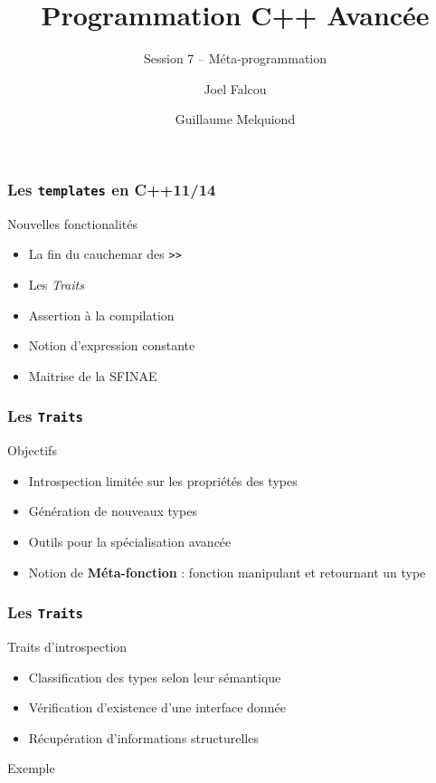 \documentclass[svgnames]{beamer}
\title{Programmation C++ Avancée}
\subtitle{Session 7 -- Méta-programmation}
\author{Joel Falcou \and Guillaume Melquiond}
\institute{Laboratoire de Recherche en Informatique}
\date{}
\begin{document}



\begin{frame}[plain]
\titlepage
\end{frame}
\setcounter{framenumber}{0}

\frame
{
  \frametitle{Les \texttt{templates} en C++11/14}

  \begin{block}{Nouvelles fonctionalit\'es}
  \begin{itemize}
  \item La fin du cauchemar des \texttt{>>}
  \item Les \textit{Traits}
  \item Assertion \`a la compilation
  \item Notion d'expression constante
  \item Maitrise de la SFINAE
  \end{itemize}
  \end{block}
}

\frame
{
  \frametitle{Les \texttt{Traits}}

  \begin{block}{Objectifs}
  \begin{itemize}
  \item Introspection limit\'ee sur les propri\'et\'es des types
  \item G\'en\'eration de nouveaux types
  \item Outils pour la sp\'ecialisation avanc\'ee
  \item Notion de \textbf{M\'eta-fonction} : fonction manipulant et retournant un type
  \end{itemize}
  \end{block}
}

\frame
{
  \frametitle{Les \texttt{Traits}}

  \begin{block}{Traits d'introspection}
  \begin{itemize}
  \item Classification des types selon leur s\'emantique
  \item V\'erification d'existence d'une interface donn\'ee
  \item R\'ecup\'eration d'informations structurelles
  \end{itemize}
  \end{block}

  \begin{block}{Exemple}
  \end{block}
}
\end{document}
